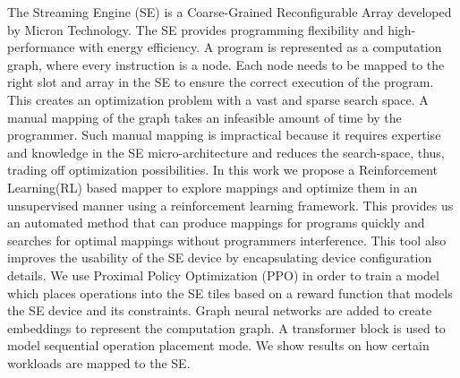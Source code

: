 The Streaming Engine (SE) is a Coarse-Grained Reconfigurable Array developed by Micron 
Technology.
The SE provides programming flexibility and high-performance with energy efficiency.
A program is represented as a computation graph, where every instruction is a node.
Each node needs to be mapped to the right slot and array in the SE to ensure the correct execution of the program.
This creates an optimization problem with a vast and sparse search space.
A manual mapping of the graph takes an infeasible amount of time by the programmer.
Such manual mapping is impractical because it requires expertise and knowledge in the SE micro-architecture and reduces the search-space, thus, trading off optimization possibilities.
In this work we propose a Reinforcement Learning(RL) based mapper to explore mappings and optimize them in an unsupervised manner using a reinforcement learning framework.
This provides us an automated method that can produce mappings for programs quickly and searches for optimal mappings without programmers interference. 
This tool also improves the usability of the SE device by encapsulating device configuration details.
We use Proximal Policy Optimization (PPO) in order to train a model which places operations into the SE tiles based on a reward function that models the SE device and its constraints.
Graph neural networks are added to create embeddings to represent the computation graph.
A transformer block is used to model sequential operation placement mode. 
We show results on how certain workloads are mapped to the SE.
